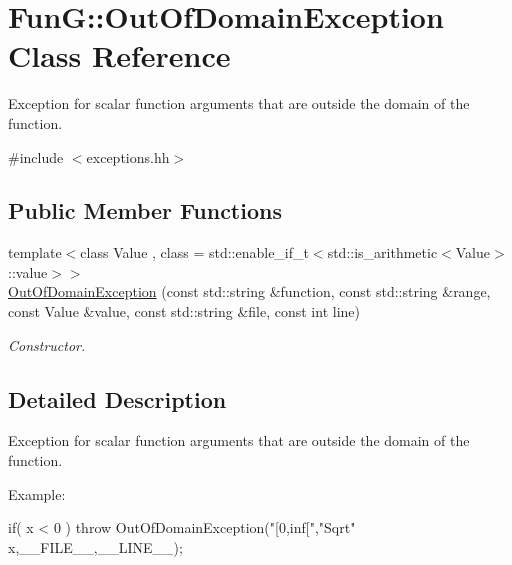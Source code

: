 \hypertarget{classFunG_1_1OutOfDomainException}{\section{\-Fun\-G\-:\-:\-Out\-Of\-Domain\-Exception \-Class \-Reference}
\label{classFunG_1_1OutOfDomainException}
}


\-Exception for scalar function arguments that are outside the domain of the function.  




{\ttfamily \#include $<$exceptions.\-hh$>$}

\subsection*{\-Public \-Member \-Functions}
\begin{DoxyCompactItemize}
\item 
{\footnotesize template$<$class Value , class  = std\-::enable\-\_\-if\-\_\-t$<$std\-::is\-\_\-arithmetic$<$\-Value$>$\-::value$>$$>$ }\\\hyperlink{classFunG_1_1OutOfDomainException_ab5dcdcbbe00be01b008e1945a1504d1b}{\-Out\-Of\-Domain\-Exception} (const std\-::string \&function, const std\-::string \&range, const \-Value \&value, const std\-::string \&file, const int line)
\begin{DoxyCompactList}\small\item\em \-Constructor. \end{DoxyCompactList}\end{DoxyCompactItemize}


\subsection{\-Detailed \-Description}
\-Exception for scalar function arguments that are outside the domain of the function. 

\-Example\-: 
\begin{DoxyCode}
 if( x < 0 )
   throw OutOfDomainException("[0,inf[","Sqrt" x,__FILE__,__LINE__);
\end{DoxyCode}
 

